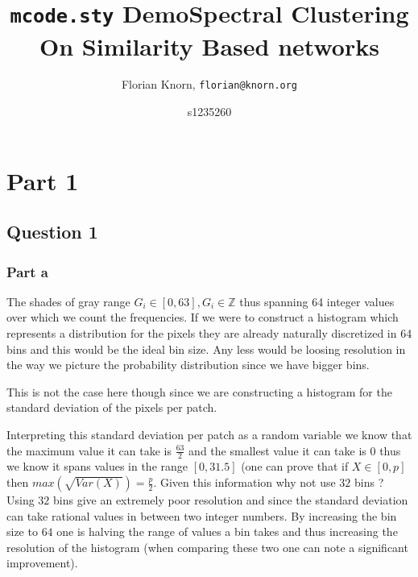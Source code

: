 \documentclass[11pt]{article}
\title{\texttt{mcode.sty} Demo}
\author{Florian Knorn, \texttt{florian@knorn.org}}
\begin{document}
\title{Spectral Clustering On Similarity Based networks}
\author{s1235260}
\maketitle
\section{Part 1}
\subsection{Question 1}
\subsubsection{Part a}
 The shades of gray range $G_{i} \in [0, 63], G_{i} \in \mathbb{Z}$ thus spanning 64 integer values over which we count the frequencies. If we were to construct a histogram which represents a distribution for the pixels they are already naturally discretized in 64 bins and this would be the ideal bin size. Any less would be loosing resolution in the way we picture the probability distribution since we have bigger bins.
 
 This is not the case here though since we are constructing a histogram for the standard deviation of the pixels per patch.
 
 Interpreting this standard deviation per patch as a random variable we know that the maximum value it can take is $ \frac{63}{2}$ and the smallest value it can take is $0$ thus we know it spans values in the range  $[0, 31.5]$ (one can prove that if $X \in [0,p]$ then $max(\sqrt{Var(X)})= \frac{p}{2}$. Given this information why not use $32$ bins ? Using $32$ bins give an extremely poor resolution and since the standard deviation can take rational values in between two integer numbers. By increasing the bin size to $64$ one is halving the range of values a bin takes and thus increasing the resolution of the histogram (when comparing these two one can note a significant improvement). 
 
\end{document}
